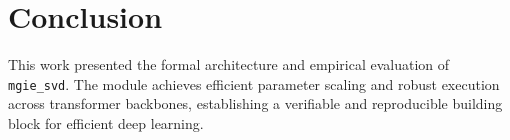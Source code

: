\section{Conclusion}
This work presented the formal architecture and empirical evaluation of \texttt{mgie_svd}. The module achieves efficient parameter scaling and robust execution across transformer backbones, establishing a verifiable and reproducible building block for efficient deep learning.
